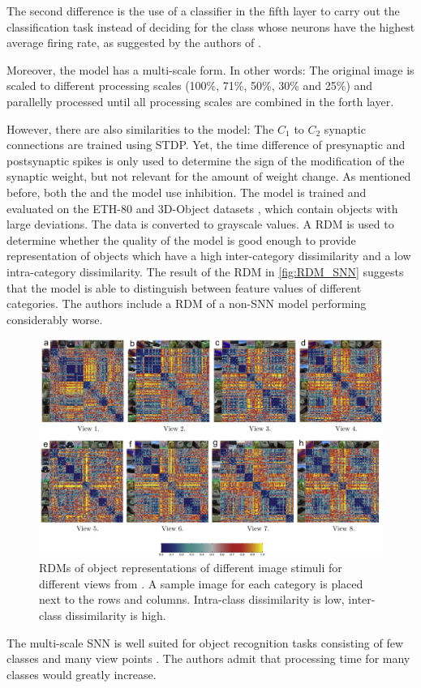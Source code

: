 The second difference is the use of a classifier in the fifth layer to carry out the classification task instead of deciding for the class whose neurons have the highest average firing rate, 
as suggested by the authors of \cite{SNN}.

Moreover, the model has a multi-scale form.
In other words: 
The original image is scaled to different processing scales (100\%, 71\%, 50\%, 30\% and 25\%) and parallelly processed until all processing scales are combined in the forth layer.

However, there are also similarities to the \cite{SNN} model:
The $C_1$ to $C_2$ synaptic connections are trained using \ac{STDP}.
Yet, the time difference of presynaptic and postsynaptic spikes is only used to determine the sign of the modification of the synaptic weight, but not relevant for the amount of weight change.
As mentioned before, both the \cite{multi_scale_STDP} and the \cite{SNN} model use inhibition.
%
The \cite{multi_scale_STDP} model is trained and evaluated on the ETH-80 and 3D-Object datasets \cite{multi_scale_STDP}, which contain objects with large deviations.
The data is converted to grayscale values.
A \ac{RDM} is used to determine whether the quality of the model is good enough to provide representation of objects which have a high inter-category dissimilarity and a low intra-category dissimilarity.
The result of the \ac{RDM} in \autoref{fig:RDM_SNN} suggests that the model is able to distinguish between feature values of different categories.
The authors include a \ac{RDM} of a non-\ac{SNN} model performing considerably worse.
%
\begin{figure}[htbp]
    \center
    \includegraphics[width=\textwidth]{pictures/inter_intra_category_dissimilarity.jpg}
    \caption{\acp{RDM} of object representations of different image stimuli for different views from \cite{multi_scale_STDP}.
    A sample image for each category is placed next to the rows and columns.
    Intra-class dissimilarity is low, inter-class dissimilarity is high.}
    \label{fig:RDM_SNN}
\end{figure}
%
The multi-scale \ac{SNN} is well suited for object recognition tasks consisting of few classes and many view points \cite{multi_scale_STDP}.
The authors admit that processing time for many classes would greatly increase.
